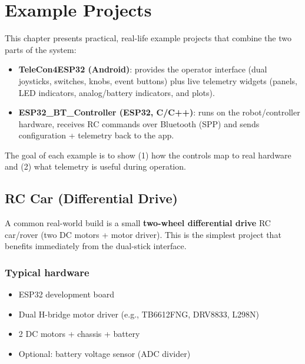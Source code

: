 \chapter{Example Projects}
\label{ch:example-projects}

This chapter presents practical, real-life example projects that combine the two parts of the system:

\begin{itemize}
    \item \textbf{TeleCon4ESP32 (Android)}: provides the operator interface (dual joysticks, switches, knobs, event buttons) plus live telemetry widgets (panels, LED indicators, analog/battery indicators, and plots).
    \item \textbf{ESP32\_BT\_Controller (ESP32, C/C++)}: runs on the robot/controller hardware, receives RC commands over Bluetooth (SPP) and sends configuration + telemetry back to the app.
\end{itemize}

The goal of each example is to show (1) how the controls map to real hardware and (2) what telemetry is useful during operation.

\section{RC Car (Differential Drive)}
\label{sec:example-rc-car}

A common real-world build is a small \textbf{two-wheel differential drive} RC car/rover (two DC motors + motor driver). This is the simplest project that benefits immediately from the dual-stick interface.

\subsection*{Typical hardware}
\begin{itemize}
    \item ESP32 development board
    \item Dual H-bridge motor driver (e.g., TB6612FNG, DRV8833, L298N)
    \item 2 DC motors + chassis + battery
    \item Optional: battery voltage sensor (ADC divider)
\end{itemize}

